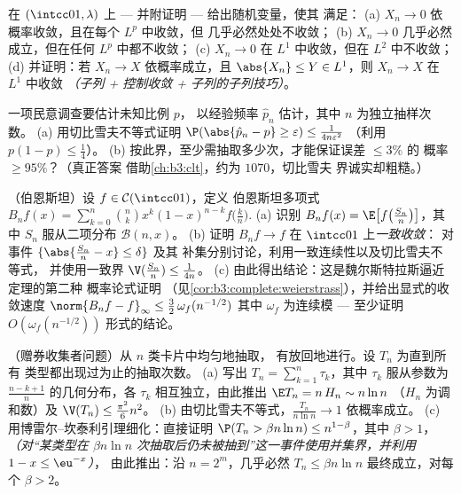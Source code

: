 \begin{exercise}[$\star\star$]\label{exo:b3:probability:6}
在 $(\intcc01, \lambda)$ 上 --- 并附证明 --- 给出随机变量，使其
满足：
(a) $X_n \to 0$ 依概率收敛，且在每个 $L^p$ 中收敛，但
几乎必然处处不收敛；
(b) $X_n \to 0$ 几乎必然成立，但在任何 $L^p$ 中都不收敛；
(c) $X_n \to 0$ 在 $L^1$ 中收敛，但在 $L^2$ 中不收敛；
(d) 并证明：若 $X_n \to X$ 依概率成立，且 $\abs{X_n}
\leq Y \in L^1$，则 $X_n \to X$ 在 $L^1$ 中收敛
\emph{（子列 + 控制收敛 +
子列的子列技巧）}。
\end{exercise}

\begin{exercise}[$\star\star$]\label{exo:b3:probability:7}
一项民意调查要估计未知比例 $p$，
以经验频率 $\hat p_n$ 估计，其中 $n$ 为独立抽样次数。
(a) 用切比雪夫不等式证明 $\P(\abs{\hat p_n - p} \geq \varepsilon)
\leq \frac1{4n\varepsilon^2}$ （利用 $p(1-p) \leq \frac14$）。
(b) 按此界，至少需抽取多少次，才能保证误差 $\leq 3\%$ 的
概率 $\geq 95\%$？（真正答案
借助\cref{ch:b3:clt}，约为 $1070$，切比雪夫
界诚实却粗糙。）
\end{exercise}

\begin{exercise}[$\star\star\star$]\label{exo:b3:probability:8}
（伯恩斯坦）设 $f \in \mathcal C(\intcc01)$，定义
伯恩斯坦多项式 $B_nf(x) =
\sum_{k=0}^n\binom nkx^k(1-x)^{n-k}f\bigl(\frac kn\bigr)$.
(a) 识别 $B_nf(x) = \E\bigl[f\bigl(\frac
{S_n}n\bigr)\bigr]$，其中 $S_n$ 服从二项分布 $\mathcal B(n, x)$。
(b) 证明 $B_nf \to f$ 在 $\intcc01$ 上\emph{一致收敛}：
对事件 $\{\abs{\frac{S_n}n - x} \leq \delta\}$ 及其
补集分别讨论，利用一致连续性以及切比雪夫不等式，
并使用一致界 $\V(\frac{S_n}n) \leq \frac1{4n}$。
(c) 由此得出结论：这是魏尔斯特拉斯逼近定理的第二种
概率论式证明
（见\cref{cor:b3:complete:weierstrass}），并给出显式的收敛速度
$\norm{B_nf - f}_\infty \leq \frac32\,\omega_f(n^{-1/2})$
其中 $\omega_f$ 为连续模 --- 至少证明
$O(\omega_f(n^{-1/2}))$ 形式的结论。
\end{exercise}

\begin{exercise}[$\star\star\star$]\label{exo:b3:probability:9}
（赠券收集者问题）从 $n$ 类卡片中均匀地抽取，
有放回地进行。设 $T_n$ 为直到所有
类型都出现过为止的抽取次数。
(a) 写出 $T_n = \sum_{k=1}^{n}\tau_k$，其中 $\tau_k$
服从参数为 $\frac{n - k + 1}n$ 的几何分布，各 $\tau_k$
相互独立，由此推出 $\E T_n = n\,H_n \sim n\ln n$
（$H_n$ 为调和数）及 $\V(T_n) \leq
\frac{\pi^2}6n^2$。
(b) 由切比雪夫不等式，$\frac{T_n}{n\ln n} \to 1$ 依概率成立。
(c) 用博雷尔–坎泰利引理细化：直接证明 $\P(T_n >
\beta n\ln n) \leq n^{1 - \beta}$，其中 $\beta > 1$，
\emph{（对“某类型在
$\beta n\ln n$ 次抽取后仍未被抽到”这一事件使用并集界，并利用 $1 - x \leq \eu^{-x}$）}，
由此推出：沿 $n = 2^m$，几乎必然 $T_n \leq \beta n\ln
n$ 最终成立，对每个 $\beta > 2$。
\end{exercise}

